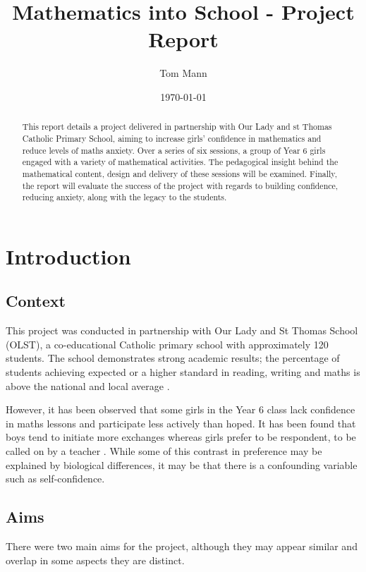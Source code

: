 \documentclass[11pt, a4paper, notitlepage]{article}
\title{Mathematics into School - Project Report}
\author{Tom Mann}
\date{\today}
\begin{document}
\maketitle

\begin{abstract}
    This report details a project delivered in partnership with Our Lady and st Thomas Catholic Primary School, aiming to increase girls' confidence in mathematics and reduce levels of maths anxiety. Over a series of six sessions, a group of Year 6 girls engaged with a variety of mathematical activities. The pedagogical insight behind the mathematical content, design and delivery of these sessions will be examined. Finally, the report will evaluate the success of the project with regards to building confidence, reducing anxiety, along with the legacy to the students.
\end{abstract}


\tableofcontents

\clearpage

\section{Introduction}

\subsection{Context}
This project was conducted in partnership with Our Lady and St Thomas School (OLST), a  co-educational Catholic primary school with approximately 120 students. The school demonstrates strong academic results; the percentage of students achieving expected or a higher standard in reading, writing and maths is above the national and local average \cite{OLST_stats}.
\par
However, it has been observed that some girls in the Year 6 class lack confidence in maths lessons and participate less actively than hoped. It has been found that boys tend to initiate more exchanges whereas girls prefer to be respondent, to be called on by a teacher \cite{Rashid:2012}. While some of this contrast in preference may be explained by biological differences, it may be that there is a confounding variable such as self-confidence.


\subsection{Aims}
There were two main aims for the project, although they may appear similar and overlap in some aspects they are distinct.
\end{document}
